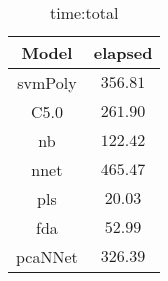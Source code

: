 \begin{table}[!ht]
	\centering
	\begin{tabular}{|c|c|}
		\hline
		Model & elapsed \\ \hline
		svmPoly & $356.81$ \\ \hline
		C5.0 & $261.90$ \\ \hline
		nb & $122.42$ \\ \hline
		nnet & $465.47$ \\ \hline
		pls & $20.03$ \\ \hline
		fda & $52.99$ \\ \hline
		pcaNNet & $326.39$ \\ \hline
	\end{tabular}
	\caption{time:total}
	\label{tab:time:total}
\end{table}
